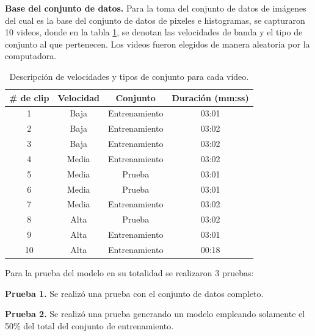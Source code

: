 \documentclass[twoside,spanish,ESP,MSc]{plantillaLabUPV}
\theoremstyle{definition}
\begin{document}
\checkmark\textbf{Base del conjunto de datos.}
Para la toma del conjunto de datos de imágenes del cual es la base del conjunto de datos de pixeles e histogramas, se capturaron 10 videos, donde en la tabla \ref{clips}, se denotan las velocidades de banda y el tipo de conjunto al que pertenecen. Los videos fueron elegidos de manera aleatoria por la computadora.


\begin{table}[!tbh]
	\caption{Descripción de velocidades y tipos de conjunto para cada video.}
	\label{clips}
	\centering
	\begin{tabular}{|c|c|c|c|}
		\hline
		\textbf{\# de clip} & \textbf{Velocidad} & \textbf{Conjunto} & \textbf{Duración (mm:ss)} \\ \hline
		1                   & Baja               & Entrenamiento     & 03:01                     \\ \hline
		2                   & Baja               & Entrenamiento     & 03:02                     \\ \hline
		3                   & Baja               & Entrenamiento     & 03:02                     \\ \hline
		4                   & Media              & Entrenamiento     & 03:02                     \\ \hline
		5                   & Media              & Prueba            & 03:01                     \\ \hline
		6                   & Media              & Prueba            & 03:01                     \\ \hline
		7                   & Media              & Entrenamiento     & 03:02                     \\ \hline
		8                   & Alta               & Prueba            & 03:02                     \\ \hline
		9                   & Alta               & Entrenamiento     & 03:01                     \\ \hline
		10                  & Alta               & Entrenamiento     & 00:18                     \\ \hline
	\end{tabular}
\end{table}

Para la prueba del modelo en su totalidad se realizaron 3 pruebas:

\checkmark\textbf{Prueba 1.} Se realizó una prueba con el conjunto de datos completo.

\checkmark\textbf{Prueba 2.} Se realizó una prueba generando un modelo empleando solamente el 50\% del total del conjunto de entrenamiento.
\end{document}
